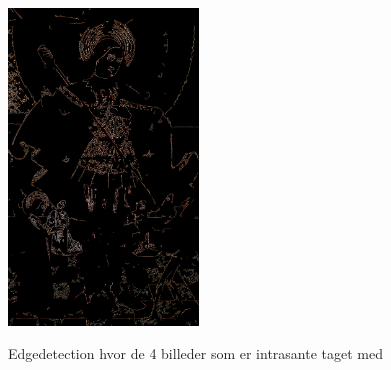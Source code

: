 \begin{figure}[!h]
{        \includegraphics[angle=0,width=0.45\textwidth]{afsnit/afprovning/billeder/thressholds/krafitige_farver/krafite_detalier/2_iteration/300-800.png}
        \label{300-800}}\hspace{1em}
        \caption[]{Edgedetection hvor de 4 billeder som er intrasante taget med}
     \label{allesammen3}
\end{figure}
 
